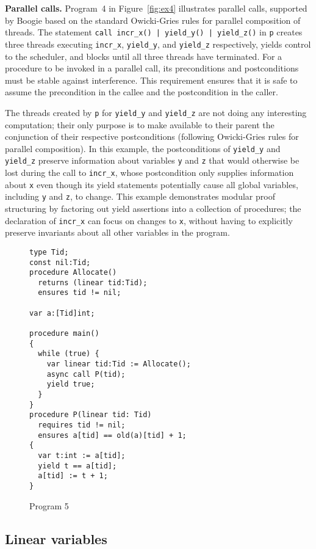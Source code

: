 {\bf Parallel calls.}
Program~4 in Figure~\ref{fig:ex4} illustrates parallel calls,
supported by Boogie
based on the standard Owicki-Gries rules for parallel composition of threads.  
The statement {\tt call incr\_x() | yield\_y() | yield\_z()} in {\tt p} creates three threads 
executing {\tt incr\_x}, {\tt yield\_y}, and {\tt yield\_z} respectively, yields control to the scheduler,
and blocks until all three threads have terminated.
For a procedure to be invoked in a parallel call, its preconditions and postconditions
must be stable against interference.
This requirement ensures that it is safe to assume the precondition in the callee
and the postcondition in the caller.

The threads created by {\tt p} for {\tt yield\_y} and {\tt yield\_z} are not doing any interesting computation; 
their only purpose is to make available to their parent the conjunction of their respective postconditions
(following Owicki-Gries rules for parallel composition).
In this example, the postconditions of {\tt yield\_y} and {\tt yield\_z} preserve information about variables
{\tt y} and {\tt z} that would otherwise be lost during the call to {\tt incr\_x},
whose postcondition only supplies information about {\tt x} even though its yield statements potentially cause
all global variables, including {\tt y} and {\tt z}, to change.
This example demonstrates modular proof structuring by factoring out yield assertions into a collection of procedures;
the declaration of {\tt incr\_x} can focus on changes to {\tt x},
without having to explicitly preserve invariants about all other variables in the program.

\begin{figure}
\begin{verbatim}
type Tid;
const nil:Tid;
procedure Allocate() 
  returns (linear tid:Tid);
  ensures tid != nil;

var a:[Tid]int;

procedure main()
{
  while (true) {
    var linear tid:Tid := Allocate();
    async call P(tid);
    yield true;
  }
}
procedure P(linear tid: Tid)
  requires tid != nil;
  ensures a[tid] == old(a)[tid] + 1;
{
  var t:int := a[tid];
  yield t == a[tid];
  a[tid] := t + 1;
}
\end{verbatim}
\caption{Program 5}
\label{fig:ex5}
\end{figure}

\subsection{Linear variables}

